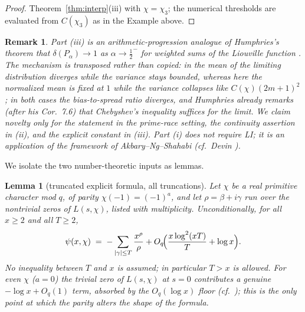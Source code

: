 \documentclass[11pt]{article}
\newtheorem{lemma}{Lemma}
\newtheorem{remark}{Remark}
\begin{document}
\begin{proof}
Theorem~\ref{thm:interp}(iii) with $\chi=\chi_3$; the numerical
thresholds are evaluated from $C(\chi_3)$ as in the Example above.
\end{proof}

\begin{remark}
Part (iii) is an arithmetic-progression analogue of Humphries's theorem
that $\delta(P_\alpha)\to1$ as $\alpha\to\tfrac12^-$ for weighted sums
of the Liouville function \cite[Thm.~1.5]{Hum13}. The mechanism is
transposed rather than copied: in \cite{Hum13} the mean of the limiting
distribution diverges while the variance stays bounded, whereas here the
normalized mean is fixed at $1$ while the variance collapses like
$C(\chi)(2m+1)^2$; in both cases the bias-to-spread ratio diverges, and
Humphries already remarks (after his Cor.~7.6) that Chebyshev's
inequality suffices for the limit. We claim novelty only for the
statement in the prime-race setting, the continuity assertion in (ii),
and the explicit constant in (iii). Part (i) does not require LI; it is
an application of the framework of Akbary--Ng--Shahabi \cite{ANS14}
(cf.\ Devin \cite{Dev20}).
\end{remark}

We isolate the two number-theoretic inputs as lemmas.

\begin{lemma}[truncated explicit formula, all truncations]\label{lem:classical}
Let $\chi$ be a real primitive character mod $q$, of parity
$\chi(-1)=(-1)^a$, and let $\rho=\beta+i\gamma$ run over the nontrivial
zeros of $L(s,\chi)$, listed with multiplicity. Unconditionally, for all
$x\ge2$ and all $T\ge2$,
\begin{equation}\label{eq:classical}
\psi(x,\chi)\;=\;-\sum_{|\gamma|\le T}\frac{x^{\rho}}{\rho}
+O_q\!\Bigl(\frac{x\log^2(xT)}{T}+\log x\Bigr).
\end{equation}
No inequality between $T$ and $x$ is assumed; in particular $T>x$ is
allowed. For even $\chi$ ($a=0$) the trivial zero of $L(s,\chi)$ at
$s=0$ contributes a genuine $-\log x+O_q(1)$ term, absorbed by the
$O_q(\log x)$ floor (cf.\ \cite[Ch.~19]{Dav00}); this is the only
point at which the parity alters the shape of the formula.
\end{lemma}
\end{document}
